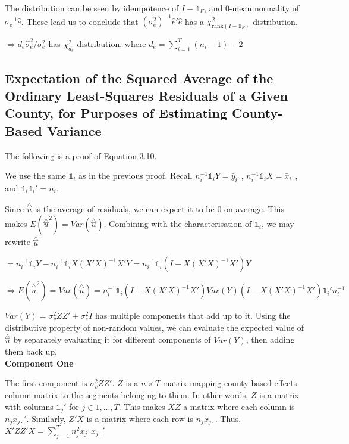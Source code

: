 \documentclass[11pt,letter]{article}
\begin{document}
The distribution can be seen by idempotence of $I-\mathds{1}_F$, and 0-mean normality of $\sigma^{-1}_e\hat e$. These lead us to conclude that $(\sigma^2_e)^{-1}\hat e'\hat e$ has a $\chi^2_{\text{rank}(I-\mathds{1}_F)}$ distribution.

\hspace{2cm}$\Rightarrow d_e\hat\sigma^2_e/\sigma^2_e$ has $\chi^2_{d_e}$ distribution, where $d_e=\sum_{i=1}^T (n_i-1)-2$

\subsection{Expectation of the Squared Average of the Ordinary Least-Squares Residuals of a Given County, for Purposes of Estimating County-Based Variance}\vspace{0.15cm}

The following is a proof of Equation 3.10.

We use the same $\mathds{1}_i$ as in the previous proof. Recall $n_i^{-1}\mathds{1}_iY=\bar y_{i\cdot}$, $n_i^{-1}\mathds{1}_iX=\bar x_{i\cdot}$, and $\mathds{1}_i\mathds{1}_i'=n_i$.

\newcommand{\ut}{\overset{\triangle}{u}}

Since $\ut$ is the average of residuals, we can expect it to be 0 on average. This makes $E(\ut^2)=Var(\ut)$. Combining with the characterisation of $\mathds{1}_i$, we may rewrite $\ut$

\hspace{2cm}$=n_i^{-1}\mathds{1}_iY-n_i^{-1}\mathds{1}_iX(X'X)^{-1}X'Y=n_i^{-1}\mathds{1}_i(I-X(X'X)^{-1}X')Y$

\hspace{1cm}$\Rightarrow E(\ut^2)=Var(\ut)=n_i^{-1}\mathds{1}_i(I-X(X'X)^{-1}X')Var(Y)(I-X(X'X)^{-1}X')\mathds{1}_i'n_i^{-1}$

$Var(Y)=\sigma^2_vZZ'+\sigma^2_eI$ has multiple components that add up to it. Using the distributive property of non-random values, we can evaluate the expected value of $\ut$ by separately evaluating it for different components of $Var(Y)$, then adding them back up.\\

\textbf{Component One}

The first component is $\sigma^2_vZZ'$. $Z$ is a $n\times T$ matrix mapping county-based effects column matrix to the segments belonging to them. In other words, $Z$ is a matrix with columns $\mathds{1}_j'$ for $j\in 1,...,T$. This makes $XZ$ a matrix where each column is $n_j\bar x_{j\cdot}'$. Similarly, $Z'X$ is a matrix where each row is $n_j\bar x_{j\cdot}$. Thus, $X'ZZ'X=\sum_{j=1}^T n_j^2\bar x_{j\cdot}\bar x_{j\cdot}'$
\end{document}
